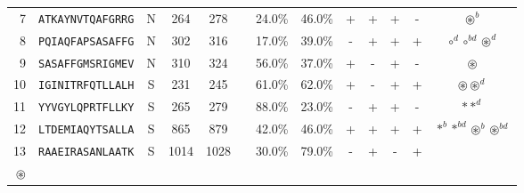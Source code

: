 \begin{tabular}{rcccccccccccc}
7  &  \texttt{ATKAYNVTQAFGRRG} &       N &    264 &   278 &                                                                  &                          24.0\% &                           46.0\% &          + &           + &          + &           - &                                                                                     $ \circledast^b $ \\
8  &  \texttt{PQIAQFAPSASAFFG} &       N &    302 &   316 &                                                                  &                          17.0\% &                           39.0\% &          - &           + &          + &           + &                                                                  $ \circ^d \circ^{bd} \circledast^d $ \\
9  &  \texttt{SASAFFGMSRIGMEV} &       N &    310 &   324 &                                                                  &                          56.0\% &                           37.0\% &          + &           - &          + &           - &                                                                                       $ \circledast $ \\
10 &  \texttt{IGINITRFQTLLALH} &       S &    231 &   245 &                                                                  &                          61.0\% &                           62.0\% &          + &           - &          + &           + &                                                                         $ \circledast \circledast^d $ \\
11 &  \texttt{YYVGYLQPRTFLLKY} &       S &    265 &   279 &                                                                  &                          88.0\% &                           23.0\% &          - &           + &          + &           - &                                                                                       $ \ast \ast^d $ \\
12 &  \texttt{LTDEMIAQYTSALLA} &       S &    865 &   879 &                                                                  &                          42.0\% &                           46.0\% &          + &           + &          + &           + &                                                   $ \ast^b \ast^{bd} \circledast^b \circledast^{bd} $ \\
13 &  \texttt{RAAEIRASANLAATK} &       S &   1014 &  1028 &                                                                  &                          30.0\% &                           79.0\% &          - &           + &          - &           + &                                 \Centerstack{  $\circ \circ^b \circ^d \circ^{bd}$ \\  $\circledast$ } \\

\end{tabular}

